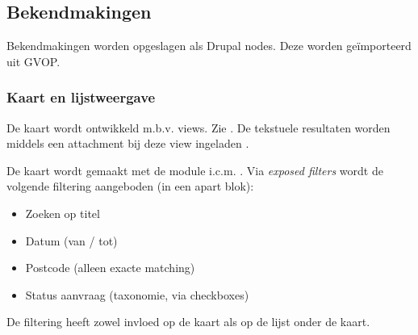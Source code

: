 \subsection{Bekendmakingen}\label{bekendmakingen}

Bekendmakingen worden opgeslagen als Drupal nodes. Deze worden ge\"{i}mporteerd uit GVOP.

\subsubsection{Kaart en lijstweergave}\label{bekendmakingen-op-de-kaart}

De kaart wordt ontwikkeld m.b.v. views. Zie . De tekstuele resultaten worden middels een attachment bij deze view ingeladen .

De kaart wordt gemaakt met de  module i.c.m. . Via \emph{exposed filters} wordt de volgende filtering aangeboden (in een apart blok):
\begin{itemize}
\item Zoeken op titel
\item Datum (van / tot)
\item Postcode (alleen exacte matching)
\item Status aanvraag (taxonomie, via checkboxes)
\end{itemize}
De filtering heeft zowel invloed op de kaart als op de lijst onder de kaart.

